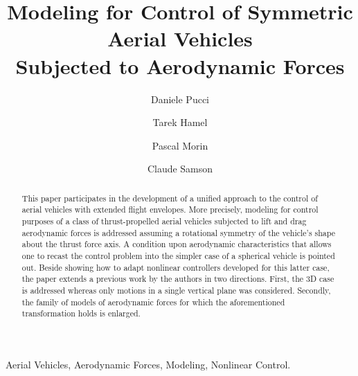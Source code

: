 \documentclass[twocolumn]{autart}
\theoremstyle{definition}
\theoremstyle{definition}
\begin{document}
\begin{frontmatter}


\title{Modeling for Control of Symmetric Aerial Vehicles\\ Subjected to Aerodynamic Forces}


\author[INRIA]{Daniele Pucci}
\author[I3S]{Tarek Hamel}
\author[UPMC]{Pascal Morin}
\author[INRIA]{Claude Samson}
\address[INRIA]{firstname.surname@inria.fr, INRIA Sophia Antipolis M\'{e}diterran\'{e}e, 2004 Route des Lucioles BP 93,
Sophia Antipolis, France}  \address[I3S]{thamel@i3s.unice.fr, I3S Universit\'e Nice Sophia-Antipolis, 2000 Route des Lucioles BP 121, 06902 Sophia-Antipolis, France}             \address[UPMC]{morin@isir.upmc.fr, ISIR, Universit\'e Pierre et Marie Curie (UPMC), 75005 Paris, France  }        

\graphicspath{{figures/}}

\begin{keyword}
Aerial Vehicles, Aerodynamic Forces, Modeling, Nonlinear Control.
\end{keyword}

\begin{abstract}
This paper participates in the development of a unified approach to the control of aerial vehicles with extended flight envelopes. More precisely,
modeling for control purposes of a class of thrust-propelled aerial vehicles subjected to lift and drag aerodynamic forces is 
addressed assuming a rotational symmetry of the vehicle's shape about 
the thrust force 
axis.
A condition upon aerodynamic characteristics that allows one to recast the control
problem into the simpler case of a spherical vehicle is pointed out. Beside showing how to adapt nonlinear controllers developed for this latter case, the paper extends a previous work by the authors in two directions.
First, the 3D case is addressed whereas only motions in a single vertical plane was considered. Secondly, the family of models of aerodynamic forces for which the aforementioned transformation holds is enlarged.
\end{abstract}

\end{frontmatter}
\end{document}
